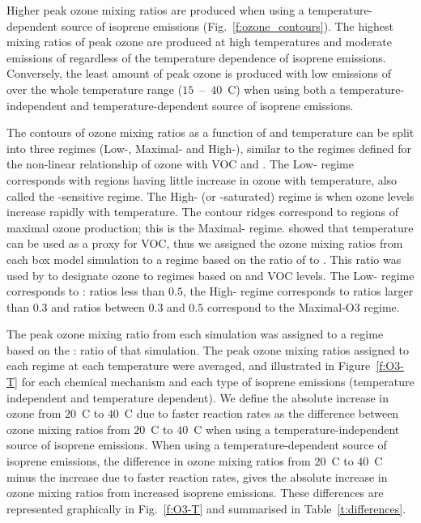 Higher peak ozone mixing ratios are produced when using a temperature-dependent source of isoprene emissions (Fig.~\ref{f:ozone_contours}).
The highest mixing ratios of peak ozone are produced at high temperatures and moderate emissions of  regardless of the temperature dependence of isoprene emissions.
Conversely, the least amount of peak ozone is produced with low emissions of  over the whole temperature range ($15$~--~$40$~\degree C) when using both a temperature-independent and temperature-dependent source of isoprene emissions.

The contours of ozone mixing ratios as a function of  and temperature can be split into three  regimes (Low-, Maximal- and High-), similar to the  regimes defined for the non-linear relationship of ozone with VOC and .
The Low- regime corresponds with regions having little increase in ozone with temperature, also called the -sensitive regime.
The High- (or -saturated) regime is when ozone levels increase rapidly with temperature. 
The contour ridges correspond to regions of maximal ozone production; this is the Maximal- regime.
\citet{Pusede:2014} showed that temperature can be used as a proxy for VOC, thus we assigned the ozone mixing ratios from each box model simulation to a  regime based on the ratio of  to .
This ratio was used by \citet{Sillman:1995} to designate ozone to  regimes based on  and VOC levels. 
The Low- regime corresponds to : ratios less than $0.5$, the High- regime corresponds to ratios larger than $0.3$ and ratios between $0.3$ and $0.5$ correspond to the Maximal-O3 regime.

The peak ozone mixing ratio from each simulation was assigned to a  regime based on the : ratio of that simulation.
The peak ozone mixing ratios assigned to each  regime at each temperature were averaged, and illustrated in Figure~\ref{f:O3-T} for each chemical mechanism and each type of isoprene emissions (temperature independent and temperature dependent).  
We define the absolute increase in ozone from $20$~\degree C to $40$~\degree C due to faster reaction rates as the difference between ozone mixing ratios from $20$~\degree C to $40$~\degree C when using a temperature-independent source of isoprene emissions.
When using a temperature-dependent source of isoprene emissions, the difference in ozone mixing ratios from $20$~\degree C to $40$~\degree C minus the increase due to faster reaction rates, gives the absolute increase in ozone mixing ratios from increased isoprene emissions.
These differences are represented graphically in Fig.~\ref{f:O3-T} and summarised in Table~\ref{t:differences}.

